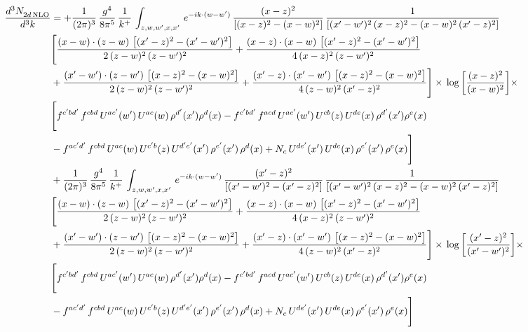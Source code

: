 \documentclass[9pt]{article}
\numberwithin{equation}{section}
\begin{document}
\begin{align}
 \frac{d^{3}N_{2d\,\rm NLO}^{\rm}}{d^{3}k}  & =   +\frac{1}{(2\pi)^{3}}\, \frac{g^{4}}{8\pi^{5}}\,\frac{1}{k^{+}}\,\int_{z,w,w^{\prime},x,x'}\, e^{-ik\cdot (w-w')}\,\frac{(x-z)^{2}}{\left[(x-z)^{2}-(x-w)^{2}\right]}\,\frac{1}{\left[(x'-w')^{2}\,(x-z)^{2} - (x-w)^{2}\,(x'-z)^{2}\right]}\notag \\ & \Bigg[\frac{(x-w)\cdot (z-w)\, \left[(x'-z)^{2}-(x'-w')^{2}\right]}{2\, (z-w)^{2}\, (z-w')^{2}}  + \frac{(x-z)\cdot (x-w)\,\left[(x'-z)^{2}-(x'-w')^{2}\right] }{4\,(x-z)^{2}\,(z-w')^{2}}\notag \\ & +\frac{(x'-w')\cdot (z-w')\, \left[(x-z)^{2}-(x-w)^{2}\right]}{2\, (z-w)^{2}\, (z-w')^{2}}+ \frac{(x'-z)\cdot (x'-w')\, \left[(x-z)^{2}-(x-w)^{2}\right]}{4\, (z-w)^{2}\,(x'-z)^{2}}\Bigg]\times\, \log{\left[\frac{(x-z)^{2}}{(x-w)^{2}}\right]} \times\notag \\ & \Bigg[f^{c'bd'}\,f^{cbd}\, U^{ac'}(w')\,U^{ac}(w)\,\rho^{d'}(x')\rho^{d}(x)- f^{c'bd'}\,f^{acd}\,U^{ac'}(w')\,U^{cb}(z)\,U^{de}(x)\,\rho^{d'}(x')\rho^{e}(x) \notag \\ & -f^{ac'd'}\,f^{cbd}\,U^{ac}(w)\,U^{c'b}(z)\,U^{d'e'}(x')\,\rho^{e'}(x')\,\rho^{d}(x) +N_{c}\,U^{de'}(x')\,U^{de}(x)\,\rho^{e'}(x')\,\rho^{e}(x)\Bigg] \notag \\
& +\frac{1}{(2\pi)^{3}}\, \frac{g^{4}}{8\pi^{5}}\,\frac{1}{k^{+}}\,\int_{z,w,w^{\prime},x,x'}\, e^{-ik\cdot (w-w')}\,\frac{(x'-z)^{2}}{\left[(x'-w')^{2}-(x'-z)^{2}\right]}\,\frac{1}{\left[(x'-w')^{2}\,(x-z)^{2} - (x-w)^{2}\,(x'-z)^{2}\right]}\notag \\ & \Bigg[\frac{(x-w)\cdot (z-w)\, \left[(x'-z)^{2}-(x'-w')^{2}\right]}{2\, (z-w)^{2}\, (z-w')^{2}}  + \frac{(x-z)\cdot (x-w)\,\left[(x'-z)^{2}-(x'-w')^{2}\right] }{4\,(x-z)^{2}\,(z-w')^{2}}\notag \\ & +\frac{(x'-w')\cdot (z-w')\, \left[(x-z)^{2}-(x-w)^{2}\right]}{2\, (z-w)^{2}\, (z-w')^{2}}+ \frac{(x'-z)\cdot (x'-w')\, \left[(x-z)^{2}-(x-w)^{2}\right]}{4\, (z-w)^{2}\,(x'-z)^{2}}\Bigg]\times\,\log{\left[\frac{(x'-z)^{2}}{(x'-w')^{2}}\right]} \times\notag \\ & \Bigg[f^{c'bd'}\,f^{cbd}\, U^{ac'}(w')\,U^{ac}(w)\,\rho^{d'}(x')\rho^{d}(x)- f^{c'bd'}\,f^{acd}\,U^{ac'}(w')\,U^{cb}(z)\,U^{de}(x)\,\rho^{d'}(x')\rho^{e}(x) \notag \\ & -f^{ac'd'}\,f^{cbd}\,U^{ac}(w)\,U^{c'b}(z)\,U^{d'e'}(x')\,\rho^{e'}(x')\,\rho^{d}(x) +N_{c}\,U^{de'}(x')\,U^{de}(x)\,\rho^{e'}(x')\,\rho^{e}(x)\Bigg]
\end{align}
\end{document}

